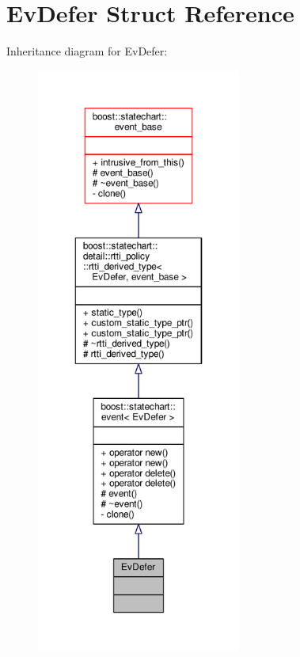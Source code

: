 \hypertarget{struct_ev_defer}{}\section{Ev\+Defer Struct Reference}
\label{struct_ev_defer}


Inheritance diagram for Ev\+Defer\+:
\nopagebreak
\begin{figure}[H]
\begin{center}
\leavevmode
\includegraphics[height=550pt]{struct_ev_defer__inherit__graph}
\end{center}
\end{figure}


